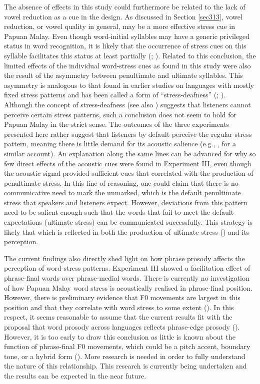 The absence of effects in this study could furthermore be related to the lack of vowel reduction as a cue in the design. As discussed in Section \ref{sec313}, vowel reduction, or vowel quality in general, may be a more effective stress cue in Papuan Malay. Even though word-initial syllables may have a generic privileged status in word recognition, it is likely that the occurrence of stress cues on this syllable facilitates this status at least partially (\citealt{mehta_detection_1988}; \citealt{mcallister_processing_1991}). Related to this conclusion, the limited effects of the individual word-stress cues as found in this study were also the result of the asymmetry between penultimate and ultimate syllables. This asymmetry is analogous to that found in earlier studies on languages with mostly fixed stress patterns and has been called a form of ``stress-deafness'' (\citealt{domahs_stress_2012}; \citealt{domahs_processing_2013}). Although the concept of stress-deafness (see also \citealt{dupoux_destressing_1997}) suggests that listeners cannot perceive certain stress patterns, such a conclusion does not seem to hold for Papuan Malay in the strict sense. The outcomes of the three experiments presented here rather suggest that listeners by default perceive the regular stress pattern, meaning there is little demand for its acoustic salience (e.g., \citealt{sulpizio_italians_2012}, for a similar account). An explanation along the same lines can be advanced for why so few direct effects of the acoustic cues were found in Experiment III, even though the acoustic signal provided sufficient cues that correlated with the production of penultimate stress. In this line of reasoning, one could claim that there is no communicative need to mark the unmarked, which is the default penultimate stress that speakers and listeners expect. However, deviations from this pattern need to be salient enough such that the words that fail to meet the default expectations (ultimate stress) can be communicated successfully. This strategy is likely that which is reflected in both the production of ultimate stress () and its perception.

The current findings also directly shed light on how phrase prosody affects the perception of word-stress patterns. Experiment III showed a facilitation effect of phrase-final words over phrase-medial words. There is currently no investigation of how Papuan Malay word stress is acoustically realised in phrase-final position. However, there is preliminary evidence that F0 movements are largest in this position and that they correlate with word stress to some extent (\citealt{kaland_different_2019}). In this respect, it seems reasonable to assume that the current results fit with the proposal that word prosody across languages reflects phrase-edge prosody (\citealt{gordon_disentangling_2014}). However, it is too early to draw this conclusion as little is known about the function of phrase-final F0 movements, which could be a pitch accent, boundary tone, or a hybrid form (\citealt{kaland_different_2019}). More research is needed in order to fully understand the nature of this relationship. This research is currently being undertaken and the results can be expected in the near future.

